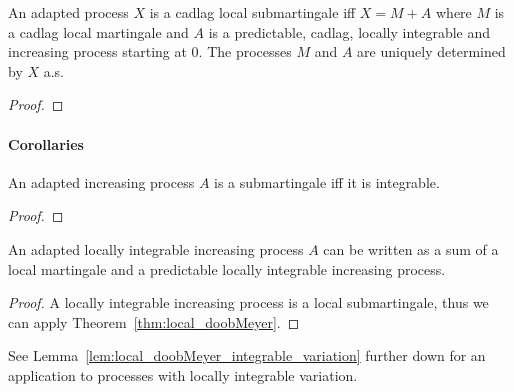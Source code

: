 \begin{theorem}\label{thm:local_doobMeyer}
  \leanok
An adapted process $X$ is a cadlag local submartingale iff $X = M + A$ where $M$ is a cadlag local martingale and $A$ is a predictable, cadlag, locally integrable and increasing process starting at $0$.
The processes $M$ and $A$ are uniquely determined by $X$ a.s.
\end{theorem}

\begin{proof}

\end{proof}


\paragraph{Corollaries}

\begin{lemma}\label{lem:submartingale_iff_integrable}
An adapted increasing process $A$ is a submartingale iff it is integrable.
\end{lemma}

\begin{proof}

\end{proof}


\begin{lemma}\label{lem:local_doobMeyer_increasing}
An adapted locally integrable increasing process $A$ can be written as a sum of a local martingale and a predictable locally integrable increasing process.
\end{lemma}

\begin{proof}
A locally integrable increasing process is a local submartingale, thus we can apply Theorem~\ref{thm:local_doobMeyer}.
\end{proof}


See Lemma~\ref{lem:local_doobMeyer_integrable_variation} further down for an application to processes with locally integrable variation.

